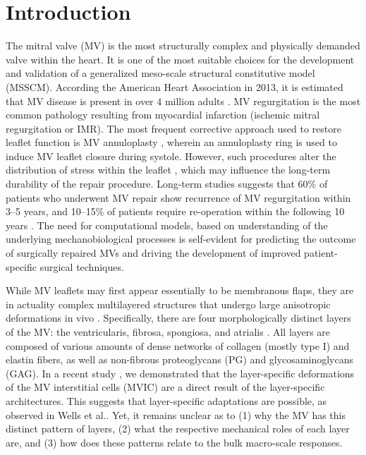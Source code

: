 \section{Introduction}
    
    The mitral valve (MV) is the most structurally complex and physically demanded valve within the heart. It is one of the most suitable choices for the development and validation of a generalized meso-scale structural constitutive model (MSSCM). According the American Heart Association in 2013, it is estimated that MV disease is present in over 4 million adults \cite{go_heart_2014}. MV regurgitation is the most common pathology resulting from myocardial infarction (ischemic mitral regurgitation or IMR). The most frequent corrective approach used to restore leaflet function is MV annuloplasty \cite{kaneko_mitral_2014, amini_vivo_2012}, wherein an annuloplasty ring is used to induce MV leaflet closure during systole. However, such procedures alter the distribution of stress within the leaflet \cite{amini_vivo_2012,salgo_effect_2002,mahmood_three_2009,jimenez_saddle_2007,padala_saddle_2009,sacks_vivo_2006,eckert_vivo_2009,rausch_vivo_2011}, which may influence the long-term durability of the repair procedure. Long-term studies suggests that 60\% of patients who underwent MV repair show recurrence of MV regurgitation within 3–5 years, and 10–15\% of patients require re-operation within the following 10 years \cite{flameng_recurrence_2003,flameng_durability_2008}. The need for computational models, based on understanding of the underlying mechanobiological processes is self-evident for predicting the outcome of surgically repaired MVs and driving the development of improved patient-specific surgical techniques.
    
    
    While MV leaflets may first appear essentially to be membranous flaps, they are in actuality complex multilayered structures that undergo large anisotropic deformations in vivo \cite{sacks_vivo_2006}. Specifically, there are four morphologically distinct layers of the MV: the ventricularis, fibrosa, spongiosa, and atrialis \cite{carruthers_alterations_2012}. All layers are composed of various amounts of dense networks of collagen (mostly type I) and elastin fibers, as well as non-fibrous proteoglycans (PG) and glycosaminoglycans (GAG). In a recent study \cite{lee_quantification_2015}, we demonstrated that the layer-specific deformations of the MV interstitial cells (MVIC) are a direct result of the layer-specific architectures. This suggests that layer-specific adaptations are possible, as observed in Wells et al.\cite{wells_physiological_2012}. Yet, it remains unclear as to (1) why the MV has this distinct pattern of layers, (2) what the respective mechanical roles of each layer are, and (3) how does these patterns relate to the bulk macro-scale responses.
    
